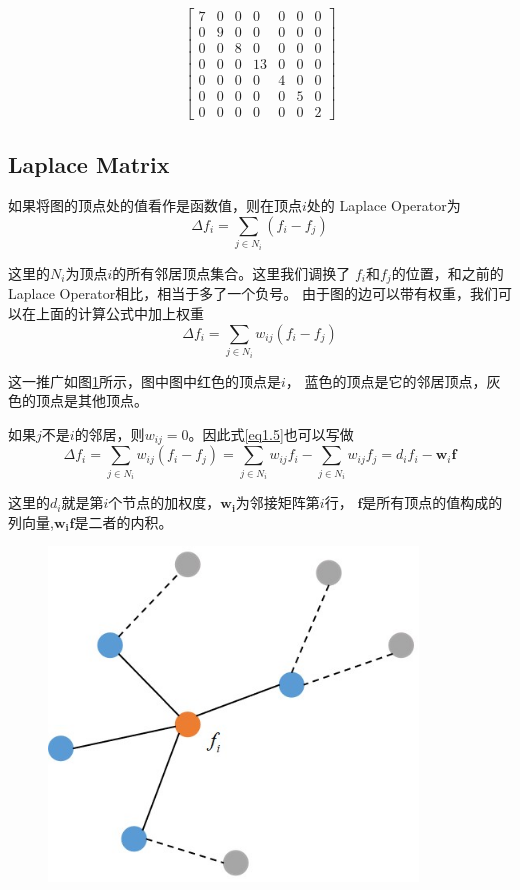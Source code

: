 \documentclass[lang=cn,10pt]{elegantbook}
\newcommand\bv[1]{\boldsymbol{#1}}
\begin{document}
\begin{equation} \label{eq1.4}
	\begin{bmatrix}
		7 & 0 & 0 & 0  & 0 & 0 & 0 \\
		0 & 9 & 0 & 0  & 0 & 0 & 0 \\
		0 & 0 & 8 & 0  & 0 & 0 & 0 \\
		0 & 0 & 0 & 13 & 0 & 0 & 0 \\
		0 & 0 & 0 & 0  & 4 & 0 & 0 \\
		0 & 0 & 0 & 0  & 0 & 5 & 0 \\
		0 & 0 & 0 & 0  & 0 & 0 & 2
	\end{bmatrix}
\end{equation}
\subsection*{Laplace Matrix}
\par 如果将图的顶点处的值看作是函数值，则在顶点$i$处的
Laplace Operator为
\begin{equation*}
	\Delta f_i=\sum_{j\in N_i}\left(f_i-f_j\right)
\end{equation*}
\par 这里的$N_i$为顶点$i$的所有邻居顶点集合。这里我们调换了
$f_i$和$f_j$的位置，和之前的Laplace Operator相比，相当于多了一个负号。
由于图的边可以带有权重，我们可以在上面的计算公式中加上权重
\begin{equation} \label{eq1.5}
	\Delta f_i=\sum_{j\in N_i}w_{ij}\left(f_i-f_j\right)
\end{equation}
\par 这一推广如图\ref{tg}所示，图中图中红色的顶点是$i$，
蓝色的顶点是它的邻居顶点，灰色的顶点是其他顶点。
\par 如果$j$不是$i$的邻居，则$w_{ij}=0$。因此式\ref{eq1.5}也可以写做
\begin{equation}
	\Delta f_i=\sum_{j\in N_i}w_{ij}\left(f_i-f_j\right)=\sum_{j\in N_i}w_{ij}f_i-\sum_{j\in N_i}w_{ij}f_j=d_if_i-\mathbf{w}_i\mathbf{f}
\end{equation}
\par 这里的$d_i$就是第$i$个节点的加权度，$\bv{w_i}$为邻接矩阵第$i$行，
$\bv{f}$是所有顶点的值构成的列向量,$\bv{w_if}$是二者的内积。
\begin{figure}[h]
	\centering
	\includegraphics[scale=0.8]{img/tg.png}
	\caption{}
	\label{tg}
\end{figure}
\end{document}
